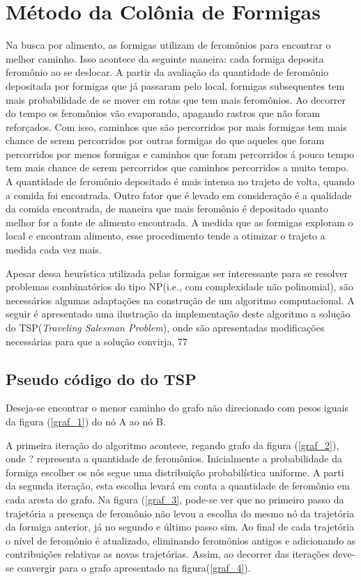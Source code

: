 \section{Método da Colônia de Formigas}

Na busca por alimento, as formigas utilizam de feromônios para encontrar o melhor caminho.
Isso acontece da seguinte maneira: cada formiga deposita feromônio ao se deslocar. A partir
da avaliação da quantidade de feromônio depositada por formigas que já passaram pelo local,
formigas subsequentes tem mais probabilidade de se mover em rotas que tem mais feromônios. Ao
decorrer do tempo os feromônios vão evaporando, apagando rastros que não foram reforçados. 
Com isso, caminhos que são percorridos por mais formigas tem mais chance de serem 
percorridos por outras formigas do que aqueles que foram percorridos por menos formigas e 
caminhos que foram percorridos á pouco tempo tem mais chance de serem percorridos que caminhos
percorridos a muito tempo. A quantidade de feromônio depositado é mais intensa no trajeto de volta,
quando a comida foi encontrada. Outro fator que é levado em consideração é a qualidade da comida
encontrada, de maneira que mais feromônio é depositado quanto melhor for a fonte de alimento encontrada.
A medida que as formigas exploram o local e encontram alimento, esse procedimento tende a otimizar o
trajeto a medida cada vez mais.

Apesar dessa heurística utilizada pelas formigas ser interessante para se resolver problemas combinatórios 
do tipo NP(i.e., com complexidade não polinomial), são necessários algumas adaptações na construção
de um algoritmo computacional. A seguir é apresentado uma ilustração da implementação deste algoritmo a solução do TSP(\textit{Traveling Salesman Problem}),
onde são apresentadas modificações necessárias para que a solução convirja, 77

\subsection{Pseudo código do  do TSP}

Deseja-se encontrar o menor caminho do grafo não direcionado com pesos iguais da figura (\ref{graf_1}) do nó A ao nó B.

A primeira iteração do algoritmo acontece, regando grafo da figura (\ref{graf_2}), onde ? representa a quantidade de feromônios.
Inicialmente a probabilidade da formiga escolher os nós segue uma distribuição probabilística uniforme. A parti da segunda iteração,
esta escolha levará em conta a quantidade de feromônio em cada aresta do grafo. Na figura (\ref{graf_3}, pode-se ver que no primeiro
passo da trajetória a presença de feromônio não levou a escolha do mesmo nó da trajetória da formiga anterior, já no segundo e último
passo sim. Ao final de cada trajetória o nível de feromônio é atualizado, eliminando feromônios antigos e adicionando as contribuições
relativas as novas trajetórias. Assim, ao decorrer das iterações deve-se convergir para o grafo apresentado na figura(\ref{graf_4}).
